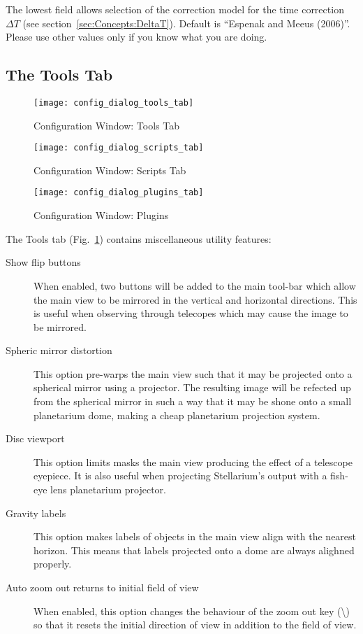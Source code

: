 The lowest field allows selection of the correction model for the time
correction $\Delta T$ (see section~\ref{sec:Concepts:DeltaT}). Default
is ``Espenak and Meeus (2006)''. Please use other values only if you
know what you are doing.

\subsection{The Tools Tab}
\label{sec:gui:configuration:tools}


\begin{figure}[p]
\centering\texttt{[image: config\_dialog\_tools\_tab]}
\caption{Configuration Window: Tools Tab}
\label{fig:gui:configuration:tools}
\end{figure}

\begin{figure}[p]
\centering\texttt{[image: config\_dialog\_scripts\_tab]}
\caption{Configuration Window: Scripts Tab}
\label{fig:gui:configuration:scripts}
\end{figure}

\begin{figure}[p]
\centering\texttt{[image: config\_dialog\_plugins\_tab]}
\caption{Configuration Window: Plugins}
\label{fig:gui:plugins}
\end{figure}


The Tools tab (Fig.~\ref{fig:gui:configuration:tools}) contains miscellaneous utility
features:

\begin{description}
\item[Show flip buttons] When enabled, two buttons will be added to
  the main tool-bar which allow the main view to be mirrored in the
  vertical and horizontal directions. This is useful when observing
  through telecopes which may cause the image to be mirrored.
\item[Spheric mirror distortion] This option pre-warps the main view
  such that it may be projected onto a spherical mirror using a
  projector. The resulting image will be refected up from the spherical
  mirror in such a way that it may be shone onto a small planetarium
  dome, making a cheap planetarium projection system.
\item[Disc viewport] This option limits masks the main view
  producing the effect of a telescope eyepiece. It is also useful when
  projecting Stellarium's output with a fish-eye lens planetarium
  projector.
\item[Gravity labels] This option makes labels of objects in the
  main view align with the nearest horizon. This means that labels
  projected onto a dome are always alighned properly.
\item[Auto zoom out returns to initial field of view] When enabled,
  this option changes the behaviour of the zoom out key
  (\textbackslash{}) so that it resets the initial direction of view in
  addition to the field of view.
\end{description}

